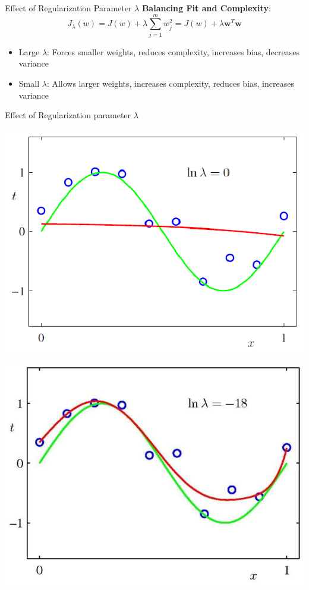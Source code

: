 \documentclass[serif, aspectratio=169]{beamer}
\begin{document}
\begin{frame}{Effect of Regularization Parameter \( \lambda \)}
    \textbf{Balancing Fit and Complexity}:
    \[
    J_{\lambda}(w) = J(w) + \lambda \sum_{j=1}^{m} w_j^2 = J(w) + \lambda \mathbf{w}^T\mathbf{w}
    \]
    \begin{itemize}
        \item Large \( \lambda \): Forces smaller weights, reduces complexity, increases bias, decreases variance
        \item Small \( \lambda \): Allows larger weights, increases complexity, reduces bias, increases variance
    \end{itemize}
\end{frame}

\begin{frame}{Effect of Regularization parameter \( \lambda \)}
    \begin{minipage}{0.32\textwidth}
        \centering
        \includegraphics[width=1.0\textwidth]{pic/Regularization/regularization_0.png}
    \end{minipage} %
    \begin{minipage}{0.32\textwidth}
        \centering
        \includegraphics[width=1.0\textwidth]{pic/Regularization/regularization_18.png}

\end{minipage}
\end{frame}
\end{document}
